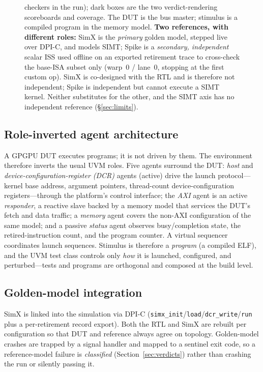 \documentclass[conference]{IEEEtran}
\newcommand{\code}[1]{\texttt{\small #1}}
\begin{document}
\begin{figure}[t]
{checkers in the run); dark boxes are the two verdict-rendering
scoreboards and coverage. The DUT is the bus master; stimulus is a
compiled program in the memory model. \textbf{Two references, with
different roles:} SimX is the \emph{primary} golden model, stepped live
over DPI-C, and models SIMT; Spike is a \emph{secondary, independent}
scalar ISS used offline on an exported retirement trace to cross-check
the base-ISA subset only (warp~0 / lane~0, stopping at the first custom
op). SimX is co-designed with the RTL and is therefore not independent;
Spike is independent but cannot execute a SIMT kernel. Neither
substitutes for the other, and the SIMT axis has no independent
reference (\S\ref{sec:limits}).}
\label{fig:arch}
\end{figure}

\subsection{Role-inverted agent architecture}
A GPGPU DUT executes programs; it is not driven by them. The
environment therefore inverts the usual UVM roles. Five agents
surround the DUT: \emph{host} and \emph{device-configuration-register
(DCR)} agents (active) drive the
launch protocol---kernel base address, argument pointers, thread-count
device-configuration registers---through the platform's control
interface; the \emph{AXI} agent is an active \emph{responder}, a
reactive slave backed by a memory model that services the DUT's fetch
and data traffic; a \emph{memory} agent covers the non-AXI
configuration of the same model; and a passive \emph{status} agent
observes busy/completion state, the retired-instruction count, and the
program counter. A virtual sequencer coordinates launch sequences.
Stimulus is therefore a \emph{program} (a compiled ELF), and the UVM
test class controls only \emph{how} it is launched, configured, and
perturbed---tests and programs are orthogonal and composed at the build
level.

\subsection{Golden-model integration}
SimX is linked into the simulation via DPI-C
(\code{simx\_init}/\code{load}/\code{dcr\_write}/\code{run} plus a
per-retirement record export). Both the RTL and SimX are rebuilt per
configuration so that DUT and reference always agree on topology.
Golden-model crashes are trapped by a signal handler and mapped to a
sentinel exit code, so a reference-model failure is \emph{classified}
(Section~\ref{sec:verdicts}) rather than crashing the run or silently
passing it.
\end{document}
